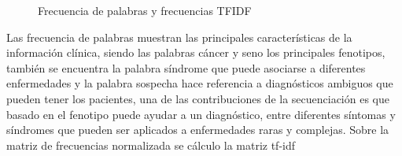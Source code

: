 \begin{figure}[H]
	\centering
	\caption{Frecuencia de palabras y frecuencias TFIDF} \label{fig:sin}
\end{figure}


Las frecuencia de palabras muestran las principales características de la información clínica, siendo las palabras cáncer y seno los principales fenotipos, también se encuentra la palabra síndrome que puede asociarse a diferentes  enfermedades y la palabra sospecha hace referencia a diagnósticos ambiguos que pueden tener los pacientes, una de las contribuciones de la secuenciación es que basado en el fenotipo puede ayudar a un diagnóstico, entre diferentes síntomas y síndromes que pueden ser aplicados a enfermedades raras y complejas\cite{Tetreault2015a}. Sobre  la matriz  de frecuencias normalizada se cálculo la matriz tf-idf \\

